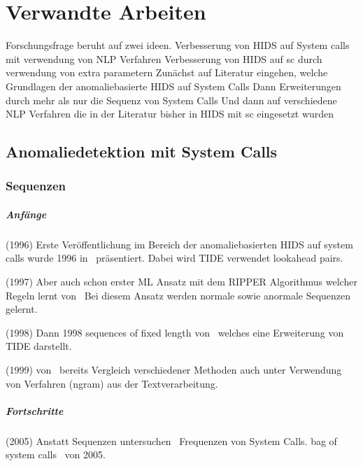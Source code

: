 \chapter{Verwandte Arbeiten}\label{ch:verwandte_arbeiten}

Forschungsfrage beruht auf zwei ideen.
Verbesserung von HIDS auf System calls mit verwendung von NLP Verfahren
Verbesserung von HIDS auf sc durch verwendung von extra parametern
Zunächst auf Literatur eingehen, welche Grundlagen der anomaliebasierte HIDS auf System Calls 
Dann Erweiterungen durch mehr als nur die Sequenz von System Calls
Und dann auf verschiedene NLP Verfahren die in der Literatur bisher in HIDS mit sc eingesetzt wurden

\section{Anomaliedetektion mit System Calls}

\subsection{Sequenzen}

    \paragraph{Anfänge}
        (1996) Erste Veröffentlichung im Bereich der anomaliebasierten HIDS auf system calls wurde 1996 in~\cite{FORREST} präsentiert.
        Dabei wird TIDE verwendet lookahead pairs.

        (1997) Aber auch schon erster \ac{ML} Ansatz mit dem RIPPER Algorithmus welcher Regeln lernt von~\cite{LEE1997}
        Bei diesem Ansatz werden normale sowie anormale Sequenzen gelernt.

        (1998) Dann 1998 sequences of fixed length von~\cite{STIDE} welches eine Erweiterung von TIDE darstellt.

        (1999) von~\cite{STIDE_Alternatives} bereits Vergleich verschiedener Methoden auch unter Verwendung von Verfahren (ngram) aus der Textverarbeitung.


    \paragraph{Fortschritte}
        (2005) Anstatt Sequenzen untersuchen~\cite{FREQUENCY2} Frequenzen von System Calls.
        \cite{FREQUENCY2} \glqq bag of system calls \grqq\ von 2005.

